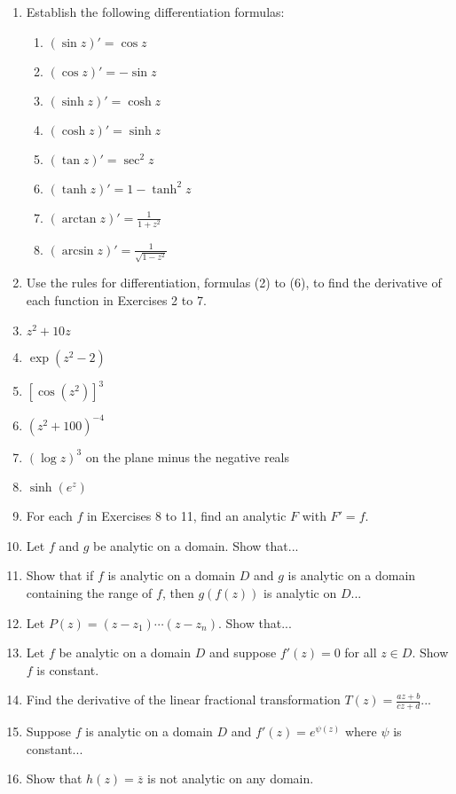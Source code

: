 \documentclass[12pt]{article}
\theoremstyle{definition} %
\theoremstyle{plain} %
\begin{document}
\begin{enumerate}
    \item Establish the following differentiation formulas:
        \begin{enumerate}
            \item $(\sin z)' = \cos z$
            \item $(\cos z)' = -\sin z$
            \item $(\sinh z)' = \cosh z$
            \item $(\cosh z)' = \sinh z$
            \item $(\tan z)' = \sec^2 z$
            \item $(\tanh z)' = 1 - \tanh^2 z$
            \item $(\arctan z)' = \frac{1}{1 + z^2}$
            \item $(\arcsin z)' = \frac{1}{\sqrt{1 - z^2}}$
        \end{enumerate}
    \item Use the rules for differentiation, formulas (2) to (6), to find the derivative of each function in Exercises 2 to 7.
    \item $z^2 + 10z$
    \item $\exp(z^2 - 2)$
    \item $[\cos(z^2)]^3$
    \item $(z^2 + 100)^{-4}$
    \item $(\log z)^3$ on the plane minus the negative reals
    \item $\sinh(e^z)$
    \item For each $f$ in Exercises 8 to 11, find an analytic $F$ with $F' = f$.
    \item Let $f$ and $g$ be analytic on a domain. Show that...
    \item Show that if $f$ is analytic on a domain $D$ and $g$ is analytic on a domain containing the range of $f$, then $g(f(z))$ is analytic on $D$...
    \item Let $P(z) = (z - z_1)\cdots (z - z_n)$. Show that...
    \item Let $f$ be analytic on a domain $D$ and suppose $f'(z)=0$ for all $z \in D$. Show $f$ is constant.
    \item Find the derivative of the linear fractional transformation $T(z) = \frac{az + b}{cz + d}$...
    \item Suppose $f$ is analytic on a domain $D$ and $f'(z) = e^{\psi(z)}$ where $\psi$ is constant...
    \item Show that $h(z) = \overline{z}$ is not analytic on any domain.

\end{enumerate}
\end{document}
